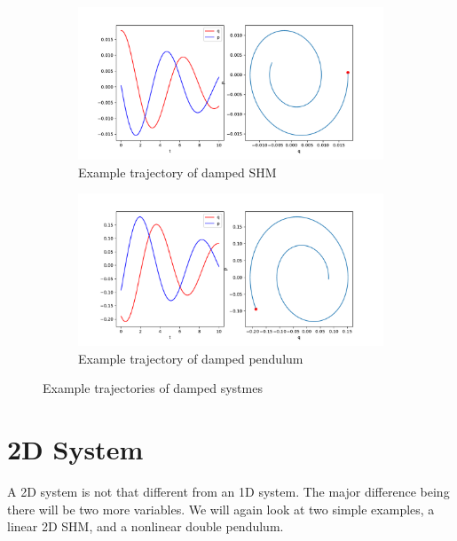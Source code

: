 \documentclass{statsmsc}
\begin{document}
\begin{figure}[H]
     \centering
     \begin{subfigure}[b]{\linewidth}
        \centering
        \includegraphics[width=0.5\linewidth]{../codes/figures/damped_shm_trajectory_1D.pdf}
        \caption{Example trajectory of damped SHM}
        \label{fig:damped_shm_trajectory}
     \end{subfigure}
     \hfill
     \begin{subfigure}[b]{\linewidth}
        \centering
        \includegraphics[width=0.5\linewidth]{../codes/figures/damped_pendulum_trajectory_1D.pdf}
        \caption{Example trajectory of damped pendulum}
        \label{fig:damped_pendulum_trajectory}
     \end{subfigure}
        \caption{Example trajectories of damped systmes}
        \label{fig:damped_trajectory}
\end{figure}

\section{2D System}
A 2D system is not that different from an 1D system. The major difference being there will be two more variables. 
We will again look at two simple examples, a linear 2D SHM, and a nonlinear double pendulum.
\end{document}
